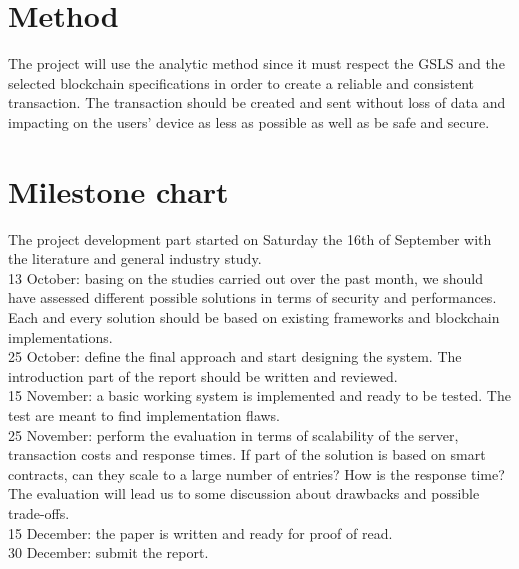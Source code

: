 \documentclass[paper=a4, fontsize=11pt]{scrartcl} %
\numberwithin{equation}{section} %
\numberwithin{figure}{section} %
\numberwithin{table}{section} %
\begin{document}
\section{Method}

The project will use the analytic method since it must respect the GSLS and the selected blockchain specifications in order to create a reliable and consistent transaction. The transaction should be created and sent without loss of data and impacting on the users' device as less as possible as well as be safe and secure.

\section{Milestone chart}

The project development part started on Saturday the 16th of September with the literature and general industry study. \\

13 October: basing on the studies carried out over the past month, we should have assessed different possible solutions in terms of security and performances. Each and every solution should be based on existing frameworks and blockchain implementations. \\

25 October: define the final approach and start designing the system. The introduction part of the report should be written and reviewed. \\

15 November: a basic working system is implemented and ready to be tested. The test are meant to find implementation flaws. \\

25 November: perform the evaluation in terms of scalability of the server, transaction costs and response times. If part of the solution is based on smart contracts, can they scale to a large number of entries? How is the response time? The evaluation will lead us to some discussion about drawbacks and possible trade-offs. \\

15 December: the paper is written and ready for proof of read. \\

30 December: submit the report. \\

\printbibliography
% 
\end{document}
